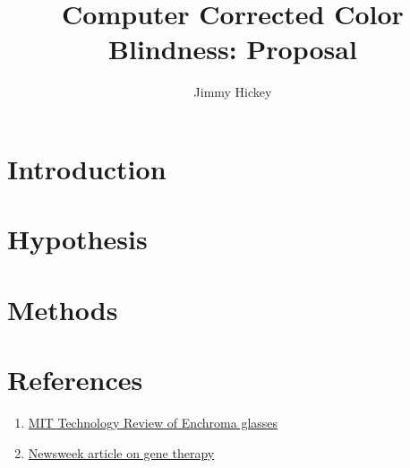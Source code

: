 \documentclass[12pt]{article}
\title{
Computer Corrected Color Blindness: Proposal
}
\author{Jimmy Hickey}
\begin{document}
\maketitle
\doublespacing


\section{Introduction}

\section{Hypothesis}

\section{Methods}

\section{References}
\singlespacing
\begin{enumerate}
	\item
		\href{https://www.technologyreview.com/s/601782/how-enchromas-glasses-correct-color-blindness/}{MIT Technology Review of Enchroma glasses}
	\item
		\href{http://www.newsweek.com/2015/05/22/cure-color-blindness-isnt-just-monkey-business-330258.html}{Newsweek article on gene therapy}
\end{enumerate}
\end{document}
